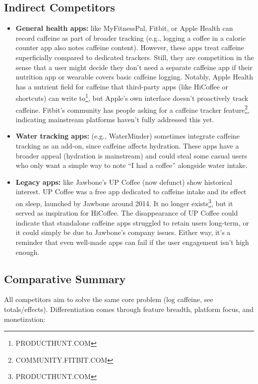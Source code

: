 \documentclass{article}
\begin{document}
\subsection{Indirect Competitors}
\begin{itemize}
    \item \textbf{General health apps:} like MyFitnessPal, Fitbit, or Apple Health can record caffeine as part of broader tracking (e.g., logging a coffee in a calorie counter app also notes caffeine content). However, these apps treat caffeine superficially compared to dedicated trackers. Still, they are competition in the sense that a user might decide they don’t need a separate caffeine app if their nutrition app or wearable covers basic caffeine logging. Notably, Apple Health has a nutrient field for caffeine that third-party apps (like HiCoffee or shortcuts) can write to\footnote{PRODUCTHUNT.COM}, but Apple’s own interface doesn’t proactively track caffeine. Fitbit’s community has people asking for a caffeine tracker feature\footnote{COMMUNITY.FITBIT.COM}, indicating mainstream platforms haven’t fully addressed this yet.
    \item \textbf{Water tracking apps:} (e.g., WaterMinder) sometimes integrate caffeine tracking as an add-on, since caffeine affects hydration. These apps have a broader appeal (hydration is mainstream) and could steal some casual users who only want a simple way to note “I had a coffee” alongside water intake.
    \item \textbf{Legacy apps:} like Jawbone’s UP Coffee (now defunct) show historical interest. UP Coffee was a free app dedicated to caffeine intake and its effect on sleep, launched by Jawbone around 2014. It no longer exists\footnote{PRODUCTHUNT.COM}, but it served as inspiration for HiCoffee. The disappearance of UP Coffee could indicate that standalone caffeine apps struggled to retain users long-term, or it could simply be due to Jawbone’s company issues. Either way, it’s a reminder that even well-made apps can fail if the user engagement isn’t high enough.
\end{itemize}

\subsection{Comparative Summary}
All competitors aim to solve the same core problem (log caffeine, see totals/effects). Differentiation comes through feature breadth, platform focus, and monetization:
\end{document}
